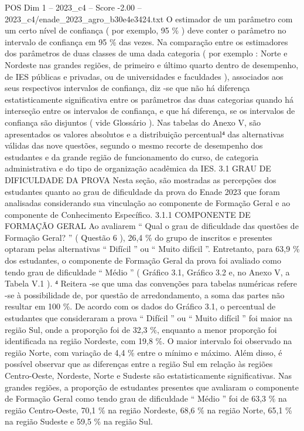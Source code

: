 \begin{textsample}{POS Dim 1 – 2023\_c4 – Score -2.00 – 2023\_c4/enade\_2023\_agro\_b30e4e3424.txt}
O estimador de um parâmetro com um certo nível de confiança ( por exemplo, 95 \% ) deve conter o parâmetro no intervalo de confiança em 95 \% das vezes.
Na comparação entre os estimadores dos parâmetros de duas classes de uma dada categoria ( por exemplo : Norte e Nordeste nas grandes regiões, de primeiro e último quarto dentro de desempenho, de IES públicas e privadas, ou de universidades e faculdades ), associados aos seus respectivos intervalos de confiança, diz -se que não há diferença estatisticamente significativa entre os parâmetros das duas categorias quando há interseção entre os intervalos de confiança, e que há diferença, se os intervalos de confiança são disjuntos ( vide Glossário ).
Nas tabelas do Anexo V, são apresentados os valores absolutos e a distribuição percentual⁴ das alternativas válidas das nove questões, segundo o mesmo recorte de desempenho dos estudantes e da grande região de funcionamento do curso, de categoria administrativa e do tipo de organização acadêmica da IES. 3.1 GRAU DE DIFICULDADE DA PROVA Nesta seção, são mostradas as percepções dos estudantes quanto ao grau de dificuldade da prova do Enade 2023 que foram analisadas considerando sua vinculação ao componente de Formação Geral e ao componente de Conhecimento Específico. 3.1.1 COMPONENTE DE FORMAÇÃO GERAL Ao avaliarem “ Qual o grau de dificuldade das questões de Formação Geral? ” ( Questão 6 ), 26,4 \% do grupo de inscritos e presentes optaram pelas alternativas “ Difícil ” ou “ Muito difícil ”.
Entretanto, para 63,9 \% dos estudantes, o componente de Formação Geral da prova foi avaliado como tendo grau de dificuldade “ Médio ” ( Gráfico 3.1, Gráfico 3.2 e, no Anexo V, a Tabela V.1 ). ⁴ Reitera -se que uma das convenções para tabelas numéricas refere -se à possibilidade de, por questão de arredondamento, a soma das partes não resultar em 100 \%.
De acordo com os dados do Gráfico 3.1, o percentual de estudantes que consideraram a prova “ Difícil ” ou “ Muito difícil ” foi maior na região Sul, onde a proporção foi de 32,3 \%, enquanto a menor proporção foi identificada na região Nordeste, com 19,8 \%.
O maior intervalo foi observado na região Norte, com variação de 4,4 \% entre o mínimo e máximo.
Além disso, é possível observar que as diferenças entre a região Sul em relação às regiões Centro-Oeste, Nordeste, Norte e Sudeste são estatisticamente significativas.
Nas grandes regiões, a proporção de estudantes presentes que avaliaram o componente de Formação Geral como tendo grau de dificuldade “ Médio ” foi de 63,3 \% na região Centro-Oeste, 70,1 \% na região Nordeste, 68,6 \% na região Norte, 65,1 \% na região Sudeste e 59,5 \% na região Sul.

\end{textsample}
